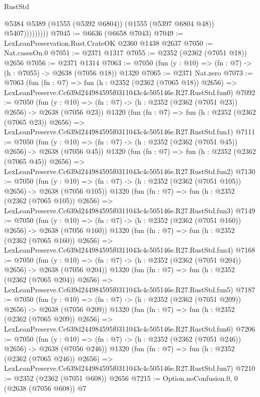\begin{lexlean}{RustStd}
\begin{coremodule}
                      @5384
                      @5389
                      (@1555 (@5392 @6804))
                      (@1555 (@5397 @6804 @48))
                      @5407)))))))))
@7045 := @6636 (@6658 @7043)
@7049 := LexLeanPreservation.Rust.CrateOK @2360 @1438 @2637
@7050 := Nat.casesOn.{0}
@7051 := @2371 @1317
@7055 := @2352 (@2362 (@7051 @18)) @2656
@7056 := @2371 @1314
@7063 := @7050 (fun (y : @10) => (fn : @7) -> (h : @7055) -> @2638 (@7056 @18)) @1320
@7065 := @2371 Nat.zero
@7073 := @7063
    (fun (fn : @7) =>
    fun (h : @2352 (@2362 (@7065 @18)) @2656) =>
    LexLeanPreserve.Cc639d244984595f0311043c4c505146e.R27.RustStd.fun0)
@7092 := @7050
    (fun (y : @10) => (fn : @7) -> (h : @2352 (@2362 (@7051 @23)) @2656) -> @2638 (@7056 @23))
    @1320
    (fun (fn : @7) =>
    fun (h : @2352 (@2362 (@7065 @23)) @2656) =>
    LexLeanPreserve.Cc639d244984595f0311043c4c505146e.R27.RustStd.fun1)
@7111 := @7050
    (fun (y : @10) => (fn : @7) -> (h : @2352 (@2362 (@7051 @45)) @2656) -> @2638 (@7056 @45))
    @1320
    (fun (fn : @7) =>
    fun (h : @2352 (@2362 (@7065 @45)) @2656) =>
    LexLeanPreserve.Cc639d244984595f0311043c4c505146e.R27.RustStd.fun2)
@7130 := @7050
    (fun (y : @10) => (fn : @7) -> (h : @2352 (@2362 (@7051 @105)) @2656) -> @2638 (@7056 @105))
    @1320
    (fun (fn : @7) =>
    fun (h : @2352 (@2362 (@7065 @105)) @2656) =>
    LexLeanPreserve.Cc639d244984595f0311043c4c505146e.R27.RustStd.fun3)
@7149 := @7050
    (fun (y : @10) => (fn : @7) -> (h : @2352 (@2362 (@7051 @160)) @2656) -> @2638 (@7056 @160))
    @1320
    (fun (fn : @7) =>
    fun (h : @2352 (@2362 (@7065 @160)) @2656) =>
    LexLeanPreserve.Cc639d244984595f0311043c4c505146e.R27.RustStd.fun4)
@7168 := @7050
    (fun (y : @10) => (fn : @7) -> (h : @2352 (@2362 (@7051 @204)) @2656) -> @2638 (@7056 @204))
    @1320
    (fun (fn : @7) =>
    fun (h : @2352 (@2362 (@7065 @204)) @2656) =>
    LexLeanPreserve.Cc639d244984595f0311043c4c505146e.R27.RustStd.fun5)
@7187 := @7050
    (fun (y : @10) => (fn : @7) -> (h : @2352 (@2362 (@7051 @209)) @2656) -> @2638 (@7056 @209))
    @1320
    (fun (fn : @7) =>
    fun (h : @2352 (@2362 (@7065 @209)) @2656) =>
    LexLeanPreserve.Cc639d244984595f0311043c4c505146e.R27.RustStd.fun6)
@7206 := @7050
    (fun (y : @10) => (fn : @7) -> (h : @2352 (@2362 (@7051 @246)) @2656) -> @2638 (@7056 @246))
    @1320
    (fun (fn : @7) =>
    fun (h : @2352 (@2362 (@7065 @246)) @2656) =>
    LexLeanPreserve.Cc639d244984595f0311043c4c505146e.R27.RustStd.fun7)
@7210 := @2352 (@2362 (@7051 @608)) @2656
@7215 := Option.noConfusion.{0, 0} (@2638 (@7056 @608)) @7

\end{coremodule}
\end{lexlean}
